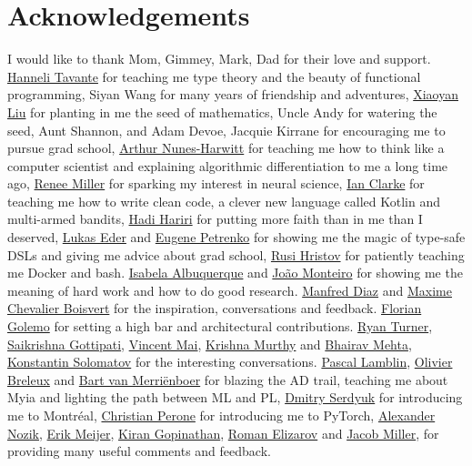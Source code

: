 \documentclass[12pt,initial,twoside,maitrise]{dms}
\numberwithin{equation}{section}
\numberwithin{table}{chapter}
\numberwithin{figure}{chapter}
\begin{document}
\chapter*{Acknowledgements}
\vspace{-50pt} I would like to thank Mom, Gimmey, Mark, Dad for their love and support. \href{http://hannelita.com/}{Hanneli Tavante} for teaching me type theory and the beauty of functional programming, Siyan Wang for many years of friendship and adventures, \href{https://laverne.edu/directory/person/xiaoyan-liu/}{Xiaoyan Liu} for planting in me the seed of mathematics, Uncle Andy for watering the seed, Aunt Shannon, and Adam Devoe, Jacquie Kirrane for encouraging me to pursue grad school, \href{https://www.cs.rit.edu/~anh/}{Arthur Nunes-Harwitt} for teaching me how to think like a computer scientist and explaining algorithmic differentiation to me a long time ago, \href{http://www.sas.rochester.edu/bcs/people/faculty/miller_renee/index.html}{Renee Miller} for sparking my interest in neural science, \href{http://blog.locut.us}{Ian Clarke} for teaching me how to write clean code, a clever new language called Kotlin and multi-armed bandits, \href{https://hadihariri.com/}{Hadi Hariri} for putting more faith than in me than I deserved, \href{http://www.jooq.org/}{Lukas Eder} and \href{https://jonnyzzz.com/}{Eugene Petrenko} for showing me the magic of type-safe DSLs and giving me advice about grad school, \href{https://github.com/rusi}{Rusi Hristov} for patiently teaching me Docker and bash. \href{https://scholar.google.ca/citations?user=-Ss9QGkAAAAJ}{Isabela Albuquerque} and \href{https://scholar.google.ca/citations?user=hkO47vsAAAAJ}{Jo\~ao Monteiro} for showing me the meaning of hard work and how to do good research. \href{https://takeitallsource.github.io}{Manfred Diaz} and \href{https://pointersgonewild.com/}{Maxime Chevalier Boisvert} for the inspiration, conversations and feedback. \href{https://fgolemo.github.io/}{Florian Golemo} for setting a high bar and architectural contributions. \href{http://TurnerComputing.com}{Ryan Turner}, \href{https://saikrishna-1996.github.io}{Saikrishna Gottipati}, \href{http://maivincent.github.io}{Vincent Mai}, \href{https://krrish94.github.io/}{Krishna Murthy} and \href{https://bhairavmehta95.github.io/}{Bhairav Mehta}, \href{http://www.solomatov.me/}{Konstantin Solomatov} for the interesting conversations. \href{https://scholar.google.ca/citations?user=bn4xHHIAAAAJ}{Pascal Lamblin}, \href{http://breuleux.net}{Olivier Breleux} and \href{https://scholar.google.ca/citations?user=XE9SDzgAAAAJ}{Bart van Merri\"enboer} for blazing the AD trail, teaching me about Myia and lighting the path between ML and PL, \href{https://scholar.google.ca/citations?user=PsKlNzUAAAAJ}{Dmitry Serdyuk} for introducing me to Montr\'eal, \href{http://christianperone.com}{Christian Perone} for introducing me to PyTorch, \href{https://research.jetbrains.org/researchers/altavir}{Alexander Nozik}, \href{https://twitter.com/headinthebox}{Erik Meijer}, \href{https://scholar.google.com/citations?user=IcuGXgcAAAAJ}{Kiran Gopinathan}, \href{https://medium.com/@elizarov}{Roman Elizarov} and \href{https://cquic.unm.edu/member/jacob.miller/}{Jacob Miller}, for providing many useful comments and feedback. 
\end{document}
